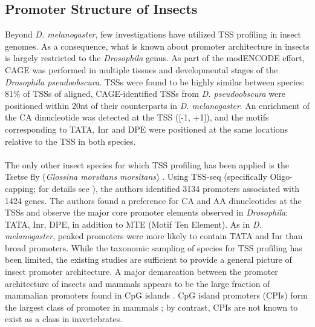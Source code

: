 \documentclass[runningheads,a4paper]{llncs}
\begin{document}
\begin{linenumbers}
\subsection{Promoter Structure of Insects}
Beyond \textit{D. melanogaster}, few investigations have utilized TSS profiling in insect genomes. 
As a consequence, what is known about promoter architecture in insects is largely restricted to the \textit{Drosophila} genus. 
As part of the modENCODE effort, CAGE was performed in multiple tissues and developmental stages of the \textit{Drosophila pseudoobscura}. 
TSSs were found to be highly similar between species: 81\% of TSSs of aligned, CAGE-identified TSSs from \textit{D. pseudoobscura} were positioned within 20nt of their counterparts in \textit{D. melanogaster}.
An enrichment of the CA dinucleotide was detected at the TSS ([-1, +1]), and the motifs corresponding to TATA, Inr and DPE were positioned at the same locations relative to the TSS in both species.
\\
\\
The only other insect species for which TSS profiling has been applied is the Tsetse fly (\textit{Glossina morsitans morsitans}) \cite{Mwangi:2015kn}. 
Using TSS-seq (specifically Oligo-capping; for details see \cite{Tsuchihara:2009dm}), the authors identified 3134 promoters associated with 1424 genes. 
The authors found a preference for CA and AA dinucleotides at the TSSs and observe the major core promoter elements observed in \textit{Drosophila}: TATA, Inr, DPE, in addition to MTE (Motif Ten Element).
As in \textit{D. melanogaster}, peaked promoters were more likely to contain TATA and Inr than broad promoters. 
While the taxonomic sampling of species for TSS profiling has been limited, the existing studies are sufficient to provide a general picture of insect promoter architecture.
A major demarcation between the promoter architecture of insects and mammals appears to be the large fraction of mammalian promoters found in CpG islands \cite{Mwangi:2015kn}.
CpG island promoters (CPIs) form the largest class of promoter in mammals \cite{Cvetesic:2017hl}; by contrast, CPIs are not known to exist as a class in invertebrates.



\end{linenumbers}
\end{document}
